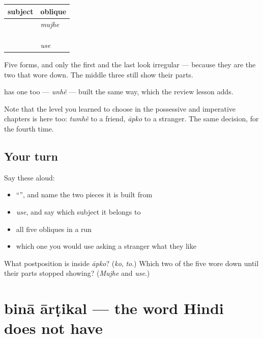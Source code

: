 \begin{grammarlens}[title={Grammar Lens: the whole set, at last}]
\noindent
\begin{tabularx}{\linewidth}{@{}>{\raggedright\arraybackslash}X>{\raggedright\arraybackslash}X@{}}
\toprule
\textbf{subject} & \textbf{oblique} \\
\midrule
\hi{मैं} & \emph{mujhe} \\
\hi{हम} & \hi{हमें} \\
\hi{तुम} & \hi{तुम्हें} \\
\hi{आप} & \textbf{\hi{आपको}} \\
\hi{वह} & \emph{use} \\
\bottomrule
\end{tabularx}

Five forms, and only the first and the last look irregular — because they are the two that wore down. The middle three still show their parts.

\textbf{} has one too — \emph{unhẽ} — built the same way, which the review lesson adds.

Note that the level you learned to choose in the possessive and imperative chapters is here too: \emph{tumhẽ} to a friend, \emph{āpko} to a stranger. The same decision, for the fourth time.
\end{grammarlens}

\subsection*{Your turn}
Say these aloud:

\begin{itemize}
\raggedright
  \item \textquotedblleft{}\textquotedblright{}, and name the two pieces it is built from
  \item \emph{use}, and say which subject it belongs to
  \item all five obliques in a run
  \item which one you would use asking a stranger what they like
\end{itemize}

\begin{tcolorbox}[breakable,colback=teal!4,colframe=teal!35!black,title={Before you move on}]
What postposition is inside \emph{āpko}? (\emph{ko}, \emph{to}.) Which two of the five wore down until their parts stopped showing? (\emph{Mujhe} and \emph{use}.)
\end{tcolorbox}
\section[\texorpdfstring{\hi{बिना} \hi{आर्टिकल} (binā ārṭikal)}{बिना आर्टिकल (binā ārṭikal)}]{binā ārṭikal — the word Hindi does not have}

